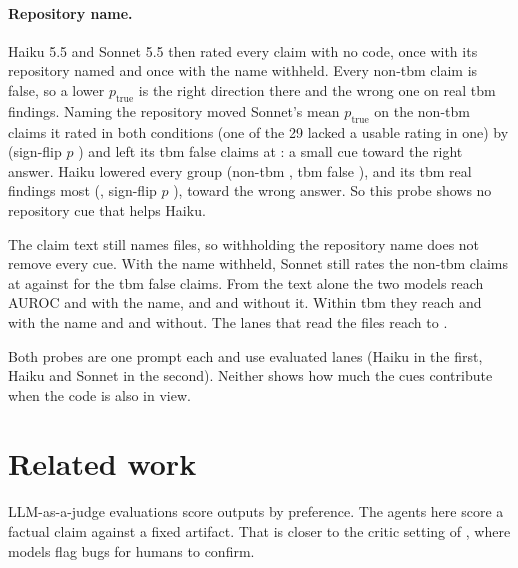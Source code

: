 \documentclass[11pt]{article}
\begin{document}
\paragraph{Repository name.} Haiku 5.5 and Sonnet 5.5 then rated every claim with no code, once with its repository named and once with the name withheld. Every non-tbm claim is false, so a lower $p_{\text{true}}$ is the right direction there and the wrong one on real tbm findings. Naming the repository moved Sonnet's mean $p_{\text{true}}$ on the  non-tbm claims it rated in both conditions (one of the 29 lacked a usable rating in one) by  (sign-flip $p$ ) and left its tbm false claims at : a small cue toward the right answer. Haiku lowered every group (non-tbm , tbm false ), and its tbm real findings most (, sign-flip $p$ ), toward the wrong answer. So this probe shows no repository cue that helps Haiku.

The claim text still names files, so withholding the repository name does not remove every cue. With the name withheld, Sonnet still rates the non-tbm claims at  against  for the tbm false claims. From the text alone the two models reach AUROC  and  with the name, and  and  without it. Within tbm they reach  and  with the name and  and  without. The lanes that read the files reach  to .

Both probes are one prompt each and use evaluated lanes (Haiku in the first, Haiku and Sonnet in the second). Neither shows how much the cues contribute when the code is also in view.

\section{Related work}

LLM-as-a-judge evaluations \citep{zheng2023judging} score outputs by preference. The agents here score a factual claim against a fixed artifact. That is closer to the critic setting of \citet{mcaleese2024critics}, where models flag bugs for humans to confirm.
\end{document}
